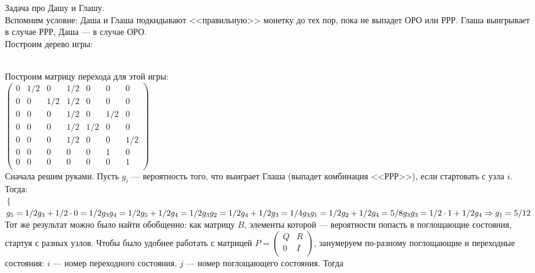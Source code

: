 Задача про Дашу и Глашу.\\
Вспомним условие: Даша и Глаша подкидывают <<правильную>> монетку до тех пор, пока не выпадет ОРО или РРР. Глаша выигрывает в случае РРР, Даша ---  в случае ОРО.\\
Построим дерево игры:
\\
Построим матрицу перехода для этой игры:\\
$\left(\begin{array}{ccccccc}
0 & 1/2 & 0 & 1/2 & 0 & 0 & 0\\
0 & 0 & 1/2 & 1/2 & 0 & 0 & 0\\
0 & 0 & 0 & 1/2 & 0 & 1/2 & 0\\
0 & 0 & 0 & 1/2 & 1/2 & 0 & 0\\
0 & 0 & 0 & 1/2 & 0 & 0 & 1/2\\ 
0 & 0 & 0 & 0 & 0 & 1 & 0\\
0 & 0 & 0 & 0 & 0 & 0 & 1\\
\end{array}\right)$\\
Сначала решим руками. Пусть $g_i$ --- вероятность того, что выиграет Глаша (выпадет комбинация <<РРР>>), если стартовать с узла $i$. Тогда:\\
$\left\{$
$g_5=1/2g_3+1/2\cdot0=1/2g_3\\
g_4=1/2g_5+1/2g_4=1/2g_3\\
g_2=1/2g_4+1/2g_3=1/4g_3\\
g_1=1/2g_2+1/2g_4=5/8g_3\\
g_3=1/2\cdot1+1/2g_4
\Rightarrow g_1=5/12\\
$
Тот же результат можно было найти обобщенно: как матрицу $B$, элементы которой --- вероятности попасть в поглощающие состояния, стартуя с разных узлов. Чтобы было удобнее работать с матрицей $P=
\left(\begin{array}{cc}
Q & R\\
0 & I\\
\end{array}\right)$, занумеруем по-разному поглощающие и переходные состояния: $i$ --- номер переходного состояния, $j$ --- номер поглощающего состояния. Тогда\\
